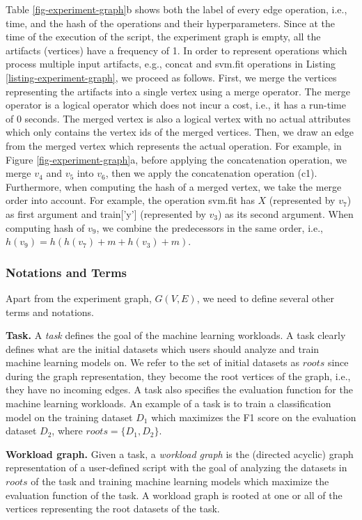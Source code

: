 Table \ref{fig-experiment-graph}b shows both the label of every edge operation, i.e., time, and the hash of the operations and their hyperparameters.
Since at the time of the execution of the script, the experiment graph is empty, all the artifacts (vertices) have a frequency of 1.
In order to represent operations which process multiple input artifacts, e.g., concat and svm.fit operations in Listing \ref{listing-experiment-graph}, we proceed as follows.
First, we merge the vertices representing the artifacts into a single vertex using a merge operator.
The merge operator is a logical operator which does not incur a cost, i.e., it has a run-time of 0 seconds.
The merged vertex is also a logical vertex with no actual attributes which only contains the vertex ids of the merged vertices.
Then, we draw an edge from the merged vertex which represents the actual operation.
For example, in Figure \ref{fig-experiment-graph}a, before applying the concatenation operation, we merge $v_4$ and $v_5$ into $v_6$, then we apply the concatenation operation (c1).
Furthermore, when computing the hash of a merged vertex, we take the merge order into account.
For example, the operation svm.fit has $X$ (represented by $v_7$) as first argument and train['y'] (represented by $v_3$) as its second argument.
When computing hash of $v_9$, we combine the predecessors in the same order, i.e., $h(v_9) = h(h(v_7) + m + h(v_3) + m)$. 
 
\subsubsection{Notations and Terms}\label{notations-terms}
Apart from the experiment graph, $G(V, E)$, we need to define several other terms and notations.

\textbf{Task.} A \textit{task} defines the goal of the machine learning workloads. 
A task clearly defines what are the initial datasets which users should analyze and train machine learning models on. 
We refer to the set of initial datasets as $roots$ since during the graph representation, they become the root vertices of the graph, i.e., they have no incoming edges.
A task also specifies the evaluation function for the machine learning workloads.
An example of a task is to train a classification model on the training dataset $D_1$ which maximizes the F1 score on the evaluation dataset $D_2$, where $roots = \{D_1, D_2\}$.

\textbf{Workload graph.} Given a task, a \textit{workload graph} is the (directed acyclic) graph representation of a user-defined script with the goal of analyzing the datasets in $roots$ of the task and training machine learning models which maximize the evaluation function of the task.
A workload graph is rooted at one or all of the vertices representing the root datasets of the task.

